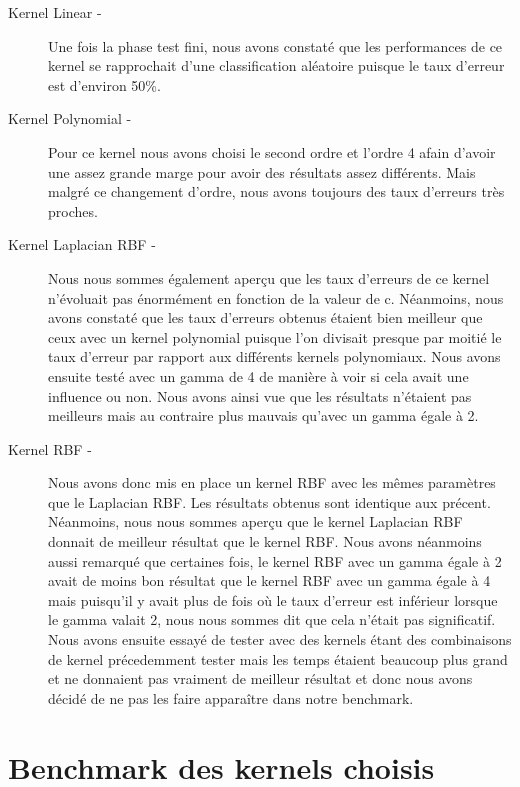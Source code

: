 \documentclass[fontsize=10pt, twoside=no]{scrartcl} %
\begin{document}
\begin{description}
\item[Kernel Linear - ] Une fois la phase test fini, nous avons constaté que les performances de ce kernel se rapprochait d'une classification aléatoire puisque le taux d'erreur  est d'environ 50\%.\\

\item[Kernel Polynomial - ] Pour ce kernel nous avons choisi le second ordre et l'ordre 4 afain d'avoir une assez grande marge pour avoir des résultats assez différents. Mais malgré ce changement d'ordre, nous avons toujours des taux d'erreurs très proches.\\

\item[Kernel Laplacian RBF - ] Nous nous sommes également aperçu que les taux d'erreurs de ce kernel n'évoluait pas énormément en fonction de la valeur de c. Néanmoins, nous avons constaté que les taux d'erreurs obtenus étaient bien meilleur que ceux avec un kernel polynomial puisque l'on divisait presque par moitié le taux d'erreur par rapport aux différents kernels polynomiaux. Nous avons ensuite testé avec un gamma de 4 de manière à voir si cela avait une influence ou non. Nous avons ainsi vue que les résultats n'étaient pas meilleurs mais au contraire plus mauvais qu'avec un gamma égale à 2.\\

\item [Kernel RBF - ] Nous avons donc mis en place un kernel RBF avec les mêmes paramètres que le Laplacian RBF. Les résultats obtenus sont identique aux précent. Néanmoins, nous nous sommes aperçu que le kernel Laplacian RBF donnait de meilleur résultat que le kernel RBF. Nous avons néanmoins aussi remarqué que certaines fois, le kernel RBF avec un gamma égale à 2 avait de moins bon résultat que le kernel RBF avec un gamma égale à 4 mais puisqu'il y avait plus de fois où le taux d'erreur est inférieur lorsque le gamma valait 2, nous nous sommes dit que cela n'était pas significatif.\\

Nous avons ensuite essayé de tester avec des kernels étant des combinaisons de kernel précedemment tester mais les temps étaient beaucoup plus grand et ne donnaient pas vraiment de meilleur résultat et donc nous avons décidé de ne pas les faire apparaître dans notre benchmark.
\end{description}

\part{Benchmark des kernels choisis}
\end{document}
